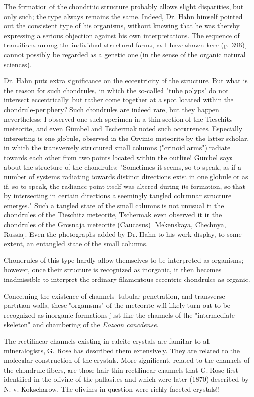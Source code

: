 \documentclass[a4paper, 12pt, oneside]{article}
\begin{document}
The formation of the chondritic structure probably allows slight disparities, but only such; the type always remains the same. Indeed, Dr. Hahn himself pointed out the consistent type of his organisms, without knowing that he was thereby expressing a serious objection against his own interpretations. The sequence of transitions among the individual structural forms, as I have shown here (p. 396), cannot possibly be regarded as a genetic one (in the sense of the organic natural sciences).

Dr. Hahn puts extra significance on the eccentricity of the structure. But what is the reason for such chondrules, in which the so-called "tube polyps" do not intersect eccentrically, but rather come together at a spot located within the chondrule-periphery? Such chondrules are indeed rare, but they happen nevertheless; I observed one such specimen in a thin section of the Tieschitz meteorite, and even Gümbel and Tschermak noted such occurrences. Especially interesting is one globule, observed in the Orvinio meteorite by the latter scholar, in which the transversely structured small columns ("crinoid arms") radiate towards each other from two points located within the outline! Gümbel says about the structure of the chondrules: "Sometimes it seems, so to speak, as if a number of systems radiating towards distinct directions exist in one globule or as if, so to speak, the radiance point itself was altered during its formation, so that by intersecting in certain directions a seemingly tangled columnar structure emerges." Such a tangled state of the small columns is not unusual in the chondrules of the Tieschitz meteorite, Tschermak even observed it in the chondrules of the Grosnaja meteorite (Caucasus) [Mekenskaya, Chechnya, Russia]. Even the photographs added by Dr. Hahn to his work display, to some extent, an entangled state of the small columns.

Chondrules of this type hardly allow themselves to be interpreted as organisms; however, once their structure is recognized as inorganic, it then becomes inadmissible to interpret the ordinary filamentous eccentric chondrules as organic.

Concerning the existence of channels, tubular penetration, and transverse-partition walls, these "organisms" of the meteorite will likely turn out to be recognized as inorganic formations just like the channels of the "intermediate skeleton" and chambering of the \emph{Eozoon canadense}.

The rectilinear channels existing in calcite crystals are familiar to all mineralogists, G. Rose has described them extensively. They are related to the molecular construction of the crystals. More significant, related to the channels of the chondrule fibers, are those hair-thin rectilinear channels that G. Rose first identified in the olivine of the pallasites and which were later (1870) described by N. v. Kokscharow. The olivines in question were richly-faceted crystals!!
\end{document}
